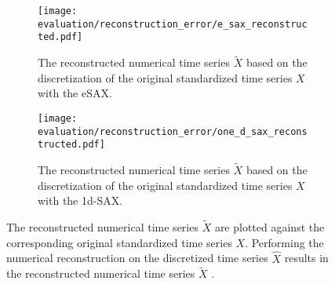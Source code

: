 \begin{figure}
\centering
\begin{subfigure}[t]{0.8\textwidth}
\texttt{[image: evaluation/reconstruction\_error/e\_sax\_reconstructed.pdf]}
\caption{The reconstructed numerical time series $\tilde{X}$ based on the discretization of the original standardized time series $X$ with the \ac{eSAX}.}
\label{fig:e_sax_reconstructed}
\end{subfigure}
\par \bigskip
\begin{subfigure}[t]{0.8\textwidth}
\texttt{[image: evaluation/reconstruction\_error/one\_d\_sax\_reconstructed.pdf]}
\caption{The reconstructed numerical time series $\tilde{X}$ based on the discretization of the original standardized time series $X$ with the \ac{1d-SAX}.}
\label{fig:one_d_sax_reconstructed}
\end{subfigure}
\caption[Reconstruction Error - Numerical Reconstruction based on the eSAX and 1d-SAX]{The reconstructed numerical time series $\tilde{X}$ are plotted against the corresponding original standardized time series $X$. Performing the numerical reconstruction on the discretized time series $\hat{X}$ results in the reconstructed numerical time series $\tilde{X}$ \cite{APCA}.}
\label{fig:reconstructed_e_sax_one_d_sax}
\end{figure}
